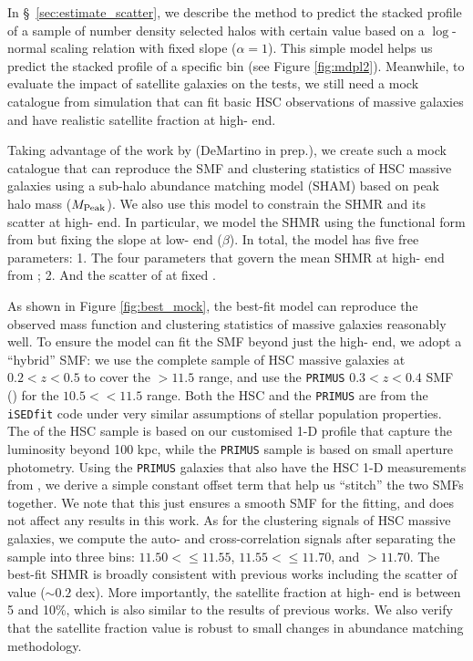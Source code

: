 \documentclass[fleqn,usenatbib,useAMS]{mnras}
\begin{document}
    In \S\ \ref{sec:estimate_scatter}, we describe the method to predict the stacked \dsigma{}
    profile of a sample of number density selected halos with certain \scatterMhaloObsSym{} value
    based on a $\log$-normal scaling relation with fixed slope ($\alpha=1$).
    This simple model helps us predict the stacked \dsigma{} profile of a specific \topn{} bin
    (see Figure \ref{fig:mdpl2}).
    Meanwhile, to evaluate the impact of satellite galaxies on the \topn{} tests, we still need
    a mock catalogue from simulation that can fit basic HSC observations of massive galaxies and
    have realistic satellite fraction at high-\mstar{} end.

    Taking advantage of the work by (DeMartino \etal{} in prep.), we create such a mock catalogue 
    that can reproduce the SMF and clustering statistics of HSC massive galaxies using a sub-halo 
    abundance matching model (SHAM) based on peak halo mass ($M_{\rm Peak}$).
    We also use this model to constrain the SHMR and its scatter at high-\mhalo{} end.
    In particular, we model the SHMR using the functional form from \citet{Behroozi2013} but
    fixing the slope at low-\mhalo{} end ($\beta$).
    In total, the model has five free parameters:
    1. The four parameters that govern the mean SHMR at high-\mhalo{} end from 
    \citet{Behroozi2013};
    2. And the scatter of \mstar{} at fixed \mhalo{}.

    As shown in Figure \ref{fig:best_mock}, the best-fit model can reproduce the observed
    mass function and clustering statistics of massive galaxies reasonably well.
    To ensure the model can fit the SMF beyond just the high-\mstar{} end, we adopt a ``hybrid''
    SMF: we use the complete sample of HSC massive galaxies at $0.2 < z < 0.5$ to cover the
    \logms{}$>11.5$ range, and use the \texttt{PRIMUS} $0.3 < z < 0.4$ SMF
    (\citealt{Moustakas2013}) for the $10.5 <$\logms{}$<11.5$ range.
    Both the HSC and the \texttt{PRIMUS} \mstar{} are from the \texttt{iSEDfit} code under very
    similar assumptions of stellar population properties.
    The \mstar{} of the HSC sample is based on our customised 1-D profile that capture the
    luminosity beyond 100 kpc, while the \texttt{PRIMUS} sample is based on small aperture
    photometry.
    Using the \texttt{PRIMUS} galaxies that also have the HSC 1-D \mstar{} measurements from
    \citet{Huang2018b}, we derive a simple constant offset term that help us ``stitch'' the two
    SMFs together.
    We note that this just ensures a smooth SMF for the fitting, and does not affect any results
    in this work.
    As for the clustering signals of HSC massive galaxies, we compute the auto- and
    cross-correlation signals after separating the sample into three \mstar{} bins: $11.50
    <$\logms{}$\leq 11.55$, $11.55 <$\logms{}$\leq 11.70$, and \logms{}$> 11.70$.
    The best-fit SHMR is broadly consistent with previous works including the scatter of
    \mstar{} value ($\sim 0.2$ dex).
    More importantly, the satellite fraction at high-\mstar{} end is between 5 and 10\%, which is also
    similar to the results of previous works.
    We also verify that the satellite fraction value is robust to small changes in abundance
    matching methodology.
\end{document}
